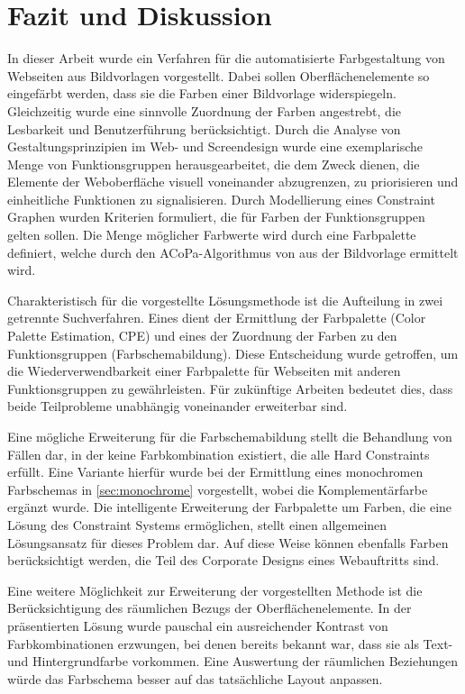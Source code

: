 \section{Fazit und Diskussion}

In dieser Arbeit wurde ein Verfahren für die automatisierte Farbgestaltung von Webseiten aus Bildvorlagen vorgestellt. Dabei sollen Oberflächenelemente so eingefärbt werden, dass sie die Farben einer Bildvorlage widerspiegeln. Gleichzeitig wurde eine sinnvolle Zuordnung der Farben angestrebt, die Lesbarkeit und Benutzerführung berücksichtigt. Durch die Analyse von Gestaltungsprinzipien im Web- und Screendesign wurde eine exemplarische Menge von Funktionsgruppen herausgearbeitet, die dem Zweck dienen, die Elemente der Weboberfläche visuell voneinander abzugrenzen, zu priorisieren und einheitliche Funktionen zu signalisieren. Durch Modellierung eines Constraint Graphen wurden Kriterien formuliert, die für Farben der Funktionsgruppen gelten sollen. Die Menge möglicher Farbwerte wird durch eine Farbpalette definiert, welche durch den ACoPa-Algorithmus von \citet{acopa} aus der Bildvorlage ermittelt wird.

Charakteristisch für die vorgestellte Lösungsmethode ist die Aufteilung in zwei getrennte Suchverfahren. Eines dient der Ermittlung der Farbpalette (Color Palette Estimation, CPE) und eines der Zuordnung der Farben zu den Funktionsgruppen (Farbschemabildung). Diese Entscheidung wurde getroffen, um die Wiederverwendbarkeit einer Farbpalette für Webseiten mit anderen Funktionsgruppen zu gewährleisten. Für zukünftige Arbeiten bedeutet dies, dass beide Teilprobleme unabhängig voneinander erweiterbar sind.

Eine mögliche Erweiterung für die Farbschemabildung stellt die Behandlung von Fällen dar, in der keine Farbkombination existiert, die alle Hard Constraints erfüllt. Eine Variante hierfür wurde bei der Ermittlung eines monochromen Farbschemas in  \autoref{sec:monochrome} vorgestellt, wobei die Komplementärfarbe ergänzt wurde. Die intelligente Erweiterung der Farbpalette um Farben, die eine Lösung des Constraint Systems ermöglichen, stellt einen allgemeinen Lösungsansatz für dieses Problem dar. Auf diese Weise können ebenfalls Farben berücksichtigt werden, die Teil des Corporate Designs eines Webauftritts sind.

Eine weitere Möglichkeit zur Erweiterung der vorgestellten Methode ist die Berücksichtigung des räumlichen Bezugs der Oberflächenelemente. In der präsentierten Lösung wurde pauschal ein ausreichender Kontrast von Farbkombinationen erzwungen, bei denen bereits bekannt war, dass sie als Text- und Hintergrundfarbe vorkommen. Eine Auswertung der räumlichen Beziehungen würde das Farbschema besser auf das tatsächliche Layout anpassen.